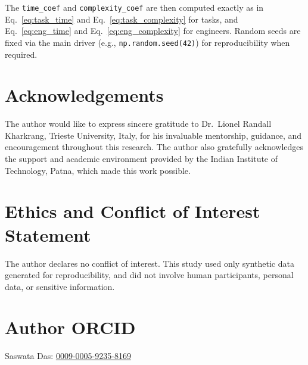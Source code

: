\documentclass[journal]{IEEEtran}
\begin{document}
The \texttt{time\_coef} and \texttt{complexity\_coef} are then computed exactly as in
Eq.~\ref{eq:task_time} and Eq.~\ref{eq:task_complexity} for tasks,
and Eq.~\ref{eq:eng_time} and Eq.~\ref{eq:eng_complexity} for engineers.
Random seeds are fixed via the main driver (e.g., \texttt{np.random.seed(42)}) for reproducibility when required.

\section*{Acknowledgements}
The author would like to express sincere gratitude to 
Dr.~Lionel Randall Kharkrang, Trieste University, Italy, 
for his invaluable mentorship, guidance, and encouragement throughout this research. 
The author also gratefully acknowledges the support and academic environment provided by the 
Indian Institute of Technology, Patna, which made this work possible.

\section*{Ethics and Conflict of Interest Statement}
The author declares no conflict of interest. 
This study used only synthetic data generated for reproducibility, 
and did not involve human participants, personal data, or sensitive information.

\section*{Author ORCID}
Saswata Das: \href{https://orcid.org/0009-0005-9235-8169}{0009-0005-9235-8169}
\end{document}
